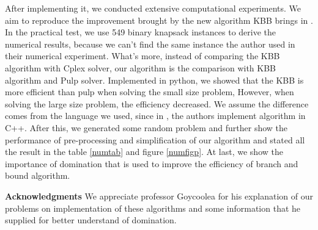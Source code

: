 \documentclass[a4paper,11pt]{article}
\begin{document}
After implementing it, we conducted extensive computational experiments. We aim to reproduce the improvement brought by the new algorithm KBB
brings in \cite{fukasawa2011exact}. In the practical test, we use 549 binary knapsack instances to derive the numerical results, because we can't find the same instance the author used in their numerical experiment. What's more, instead of comparing the KBB algorithm with Cplex solver, our algorithm is the comparison with KBB algorithm and Pulp solver. Implemented in python, we showed that the KBB is more efficient than pulp when solving the small size problem, However, when solving the large size problem, the efficiency decreased. We assume the difference comes from the language we used, since in \cite{fukasawa2011exact}, the authors implement algorithm in C++.  After this, we generated some random problem and further show the performance of pre-processing and simplification of our algorithm and stated all the result in the table \ref{numtab} and figure \ref{numfigp}. At last, we show the importance of domination that is used to improve the efficiency of branch and bound algorithm.

\textbf{Acknowledgments} We appreciate professor Goycoolea for his explanation of our problems on implementation of these algorithms and some information that he supplied for better understand of domination.  

 

 
\end{document}
